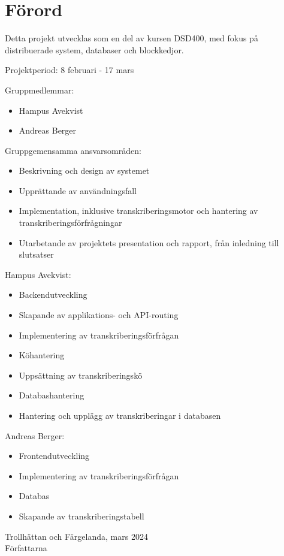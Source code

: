 \thispagestyle{plain}

\section{Förord}
Detta projekt utvecklas som en del av kursen DSD400, med fokus på
distribuerade system, databaser och blockkedjor. 

Projektperiod: 8 februari - 17 mars

Gruppmedlemmar:
\begin{itemize}
    \item Hampus Avekvist
    \item Andreas Berger
\end{itemize}

Gruppgemensamma ansvarsområden:
\begin{itemize}
    \item Beskrivning och design av systemet
    \item Upprättande av användningsfall
    \item Implementation, inklusive transkriberingsmotor och hantering av transkriberingsförfrågningar
    \item Utarbetande av projektets presentation och rapport, från inledning till slutsatser
\end{itemize}

Hampus Avekvist:
\begin{itemize}
    \item Backendutveckling
    \item Skapande av applikations- och API-routing
    \item Implementering av transkriberingsförfrågan
    \item Köhantering
    \item Uppsättning av transkriberingskö
    \item Databashantering
    \item Hantering och upplägg av transkriberingar i databasen
\end{itemize}

Andreas Berger:
\begin{itemize}
    \item Frontendutveckling
    \item Implementering av transkriberingsförfrågan
    \item Databas
    \item Skapande av transkriberingstabell
\end{itemize}

Trollhättan och Färgelanda, mars 2024 \\
Författarna
